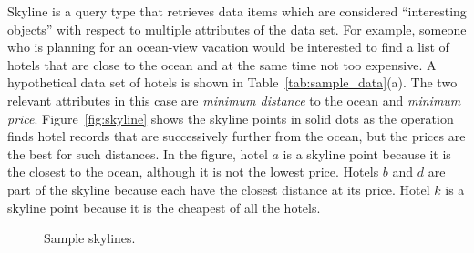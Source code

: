 
Skyline is a query type that retrieves data items which are
considered ``interesting objects'' with respect to multiple
attributes of the data set. For example, someone who is planning
for an ocean-view vacation would be interested to find a list of
hotels that are close to the ocean and at the same time not too
expensive. A hypothetical data set of hotels is shown in
Table~\ref{tab:sample_data}(a). The two relevant attributes in
this case are \emph{minimum distance} to the ocean and
\emph{minimum price}. Figure~\ref{fig:skyline} shows the skyline
points in solid dots as the operation finds hotel records that are
successively further from the ocean, but the prices are the best
for such distances. In the figure, hotel $a$ is a skyline point
because it is the closest to the ocean, although it is not the
lowest price. Hotels $b$ and $d$ are part of the skyline because
each have the closest distance at its price. Hotel $k$ is a
skyline point because it is the cheapest of all the hotels.

\begin{figure}[!t]
\centering {}  \vspace*{-5pt}\caption{Sample skylines.} \vspace*{-5pt}
\end{figure}

